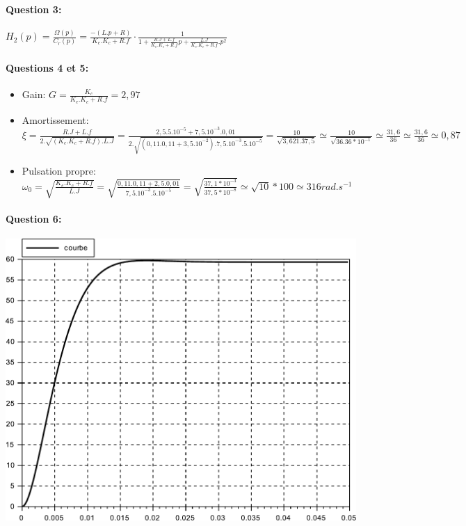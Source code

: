 \paragraph{Question 3:} $H_2(p)=\frac{{\Omega}(p)}{C_r(p)}=\frac{-(L.p+R)}{K_e.K_c+R.f} \cdot \frac{1}{1+\frac{R.J+L.f}{K_e.K_c+R.f}p+\frac{L.J}{K_e.K_c+R.f}.p^2}$

\paragraph{Questions 4 et 5:} 

\begin{itemize}
	\item Gain:  $G=\frac{K_c}{K_e.K_c+R.f}=2,97$
	\item Amortissement: $\xi=\frac{R.J+L.f}{2.\sqrt{(K_e.K_c+R.f).L.J}}=\frac{2,5.5.10^{-5}+7,5.10^{-3}.0,01}{2.\sqrt{(0,11.0,11+3,5.10^{-2}).7,5.10^{-3}.5.10^{-5}}}=\frac{10}{\sqrt{3,621.37,5}}\simeq\frac{10}{\sqrt{36.36*10^{-1}}}\simeq\frac{31,6}{36}\simeq\frac{31,6}{36}\simeq0,87$
	\item Pulsation propre: $\omega_0=\sqrt{\frac{K_e.K_c+R.f}{L.J}}=\sqrt{\frac{0,11.0,11+2,5.0,01}{7,5.10^{-3}.5.10^{-5}}}=
\sqrt{\frac{37,1*10^{-3}}{37,5*10^{-8}}}\simeq\sqrt{10}*100\simeq 316rad.s^{-1}$
\end{itemize}

\paragraph{Question 6:} 

\begin{center}
 \includegraphics[width=0.8\linewidth]{img/Figure_moteur_charge}
\end{center}


